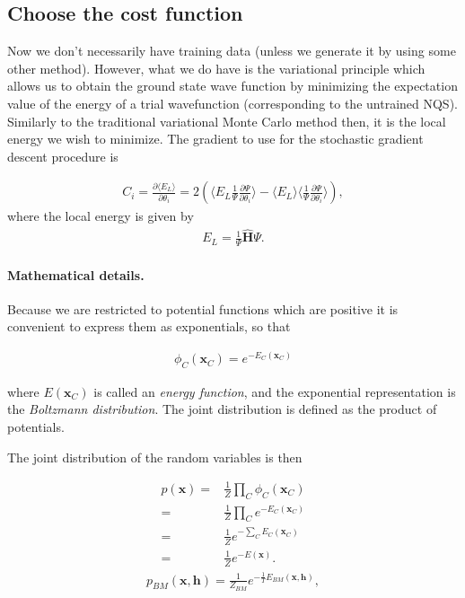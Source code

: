 \documentclass[%
oneside,                 %
final,                   %
10pt]{article}
\begin{document}
\subsection{Choose the cost function}

Now we don't necessarily have training data (unless we generate it by using some other method). However, what we do have is the variational principle which allows us to obtain the ground state wave function by minimizing the expectation value of the energy of a trial wavefunction (corresponding to the untrained NQS). Similarly to the traditional variational Monte Carlo method then, it is the local energy we wish to minimize. The gradient to use for the stochastic gradient descent procedure is

\begin{align}
	C_i = \frac{\partial \langle E_L \rangle}{\partial \theta_i}
	= 2(\langle E_L \frac{1}{\Psi}\frac{\partial \Psi}{\partial \theta_i} \rangle - \langle E_L \rangle \langle \frac{1}{\Psi}\frac{\partial \Psi}{\partial \theta_i} \rangle ),
\end{align}
where the local energy is given by
\begin{align}
	E_L = \frac{1}{\Psi} \hat{\mathbf{H}} \Psi.
\end{align}



\paragraph{Mathematical details.}
Because we are restricted to potential functions which are positive it
is convenient to express them as exponentials, so that

\begin{align}
	\phi_C (\bm{x}_C) = e^{-E_C(\bm{x}_C)}
\end{align}

where $E(\bm{x}_C)$ is called an \emph{energy function}, and the
exponential representation is the \emph{Boltzmann distribution}. The
joint distribution is defined as the product of potentials.

The joint distribution of the random variables is then

\begin{align}
	p(\bm{x}) =& \frac{1}{Z} \prod_C \phi_C (\bm{x}_C) \nonumber \\
	=& \frac{1}{Z} \prod_C e^{-E_C(\bm{x}_C)} \nonumber \\
	=& \frac{1}{Z} e^{-\sum_C E_C(\bm{x}_C)} \nonumber \\
	=& \frac{1}{Z} e^{-E(\bm{x})}.
\end{align} 
\begin{align}
	p_{BM}(\bm{x}, \bm{h}) = \frac{1}{Z_{BM}} e^{-\frac{1}{T}E_{BM}(\bm{x}, \bm{h})} ,
\end{align}
\end{document}
